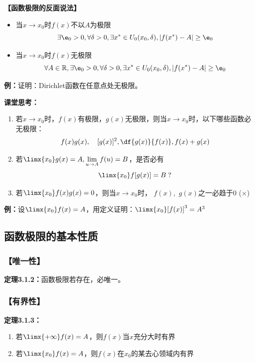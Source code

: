 \begin{shaded}
	{\bf 【函数极限的反面说法】}
	
	\begin{itemize}
	  \item 当$x\to x_0$时$f(x)$不以$A$为极限 
	    $$\exists\e_0>0,\forall\delta>0, \exists x^*\in
	    U_0(x_0,\delta),|f(x^*)-A|\geq\e_0$$ 
	  \item 当$x\to x_0$时$f(x)$无极限
		$$\forall A\in\mathbb{R},\exists\e_0>0,\forall\delta>0, \exists x^*\in
	    U_0(x_0,\delta),|f(x^*)-A|\geq\e_0$$ 
	\end{itemize}
	
	{\bf 例：}证明：Dirichlet函数在任意点处无极限。
\end{shaded}

{\bf 课堂思考：}
\begin{enumerate}[(1)]
  \setlength{\itemindent}{1cm}
  \item 若$x\to x_0$时，$f(x)$有极限，$g(x)$无极限，则当$x\to x_0$时，以下哪些函数必无极限：
  $$f(x)g(x),\quad [g(x)]^2,\df{g(x)}{f(x)}, f(x)+g(x)$$ 
  \item 若$\limx{x_0}g(x)=A,\lim\limits_{u\to A}f(u)=B$，是否必有
  $$\limx{x_0}f[g(x)]=B\;?$$
  \item 若$\limx{x_0}f(x)g(x)=0$，则当$x\to
  x_0$时， $f(x),$ $g(x)$之一必趋于$0$ ({$\times$})
\end{enumerate}

{\bf 例：}设$\limx{x_0}f(x)=A$，用定义证明：$\limx{x_0}[f(x)]^3=A^3$

\subsection{函数极限的基本性质}

\subsubsection{【唯一性】}

{\bf 定理3.1.2：}函数极限若存在，必唯一。

\subsubsection{【有界性】}

{\bf 定理3.1.3：}
\begin{enumerate}[(1)]
  \setlength{\itemindent}{1cm}
  \item 若$\limx{+\infty}f(x)=A$，则$f(x)$当$x$充分大时有界
  \item 若$\limx{x_0}f(x)=A$，则$f(x)$在$x_0$的某去心领域内有界
\end{enumerate}

